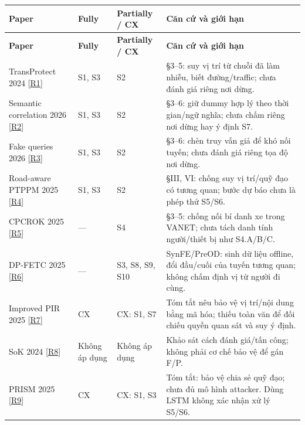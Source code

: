 \begingroup\small
\begin{longtable}{@{}P{3.387cm}P{1.742cm}P{2.613cm}P{8.614cm}@{}}
\toprule
\textbf{Paper} & \textbf{Fully} & \textbf{Partially / CX} & \textbf{Căn cứ và giới hạn}\\\midrule
\endfirsthead
\toprule
\textbf{Paper} & \textbf{Fully} & \textbf{Partially / CX} & \textbf{Căn cứ và giới hạn}\\\midrule
\endhead
\bottomrule\endfoot
TransProtect 2024 [\href{https://arxiv.org/html/2409.09495v1}{R1}] & S1, S3 & S2 & §3–5: suy vị trí từ chuỗi đã làm nhiễu, biết đường/traffic; chưa đánh giá riêng nơi dừng.\\
\addlinespace[3pt]
Semantic correlation 2026 [\href{https://link.springer.com/article/10.1007/s44443-026-00899-w}{R2}] & S1, S3 & S2 & §3–6: giữ dummy hợp lý theo thời gian/ngữ nghĩa; chưa chấm riêng nơi dừng hay ý định S7.\\
\addlinespace[3pt]
Fake queries 2026 [\href{https://link.springer.com/article/10.1007/s44443-025-00438-z}{R3}] & S1, S3 & S2 & §3–6: chèn truy vấn giả để khó nối tuyến; chưa đánh giá riêng tọa độ nơi dừng.\\
\addlinespace[3pt]
Road-aware PTPPM 2025 [\href{https://arxiv.org/html/2511.21020v1}{R4}] & S1, S3 & S2 & §III, VI: chống suy vị trí/quỹ đạo có tương quan; bước dự báo chưa là phép thử S5/S6.\\
\addlinespace[3pt]
CPCROK 2025 [\href{https://uhra.herts.ac.uk/id/eprint/25705/1/futureinternet-17-00165.pdf}{R5}] & — & S4 & §3–5: chống nối bí danh xe trong VANET; chưa tách danh tính người/thiết bị như S4.A/B/C.\\
\addlinespace[3pt]
DP-FETC 2025 [\href{https://www.aimspress.com/aimspress-data/era/2025/11/PDF/era-33-11-293.pdf}{R6}] & — & S3, S8, S9, S10 & SynFE/PreOD: sinh dữ liệu offline, đổi đầu/cuối của tuyến tương quan; không chấm định vị từ người đi cùng.\\
\addlinespace[3pt]
Improved PIR 2025 [\href{https://onlinelibrary.wiley.com/doi/abs/10.1002/cpe.70447}{R7}] & CX & CX: S1, S7 & Tóm tắt nêu bảo vệ vị trí/nội dung bằng mã hóa; thiếu toàn văn để đối chiếu quyền quan sát và suy ý định.\\
\addlinespace[3pt]
SoK 2024 [\href{https://petsymposium.org/popets/2024/popets-2024-0068.pdf}{R8}] & Không áp dụng & Không áp dụng & Khảo sát cách đánh giá/tấn công; không phải cơ chế bảo vệ để gán F/P.\\
\addlinespace[3pt]
PRISM 2025 [\href{https://www.sciencedirect.com/science/article/pii/S1084804525001687}{R9}] & CX & CX: S1, S3 & Tóm tắt: bảo vệ chia sẻ quỹ đạo; chưa đủ mô hình attacker. Dùng LSTM không xác nhận xử lý S5/S6.\\

\end{longtable}
